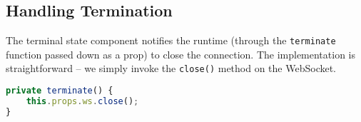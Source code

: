 \subsection{Handling Termination}

The terminal state component notifies the runtime (through
the \texttt{terminate} function passed down as a prop)
to close the connection. The implementation is straightforward --
we simply invoke the \texttt{close()} method on the WebSocket.

\begin{lstlisting}[language=javascript,numbers=none]
private terminate() {
	this.props.ws.close();
}
\end{lstlisting}
